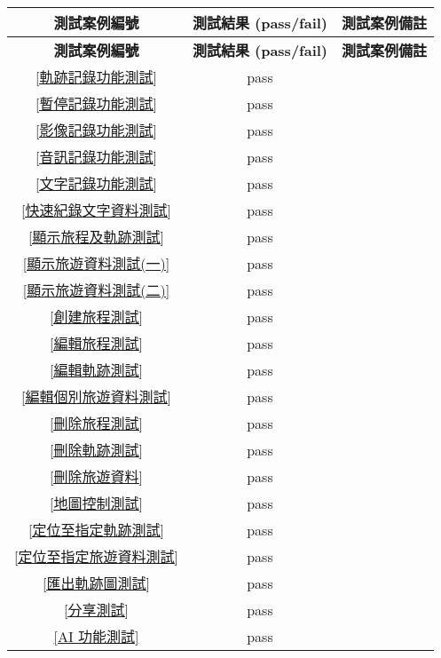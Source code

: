 \begin{longtable}{|c|c|p{8.9cm}|}
  \hline
  \textbf{測試案例編號} & \textbf{測試結果 (pass/fail)} & \textbf{測試案例備註} \\
  \hline
  \endfirsthead
  \hline
  \textbf{測試案例編號} & \textbf{測試結果 (pass/fail)} & \textbf{測試案例備註} \\
  \hline
  \endhead
  \ref{軌跡記錄功能測試} & pass & \\ 
  \hline
  \ref{暫停記錄功能測試} & pass & \\ 
  \hline
  \ref{影像記錄功能測試} & pass & \\ 
  \hline
  \ref{音訊記錄功能測試} & pass & \\ 
  \hline
  \ref{文字記錄功能測試} & pass & \\ 
  \hline
  \ref{快速紀錄文字資料測試} & pass & \\ 
  \hline
  \ref{顯示旅程及軌跡測試} & pass & \\ 
  \hline
  \ref{顯示旅遊資料測試(一)} & pass & \\ 
  \hline
  \ref{顯示旅遊資料測試(二)} & pass & \\ 
  \hline
  \ref{創建旅程測試} & pass & \\ 
  \hline
  \ref{編輯旅程測試} & pass & \\ 
  \hline
  \ref{編輯軌跡測試} & pass & \\ 
  \hline
  \ref{編輯個別旅遊資料測試} & pass & \\ 
  \hline
  \ref{刪除旅程測試} & pass & \\ 
  \hline
  \ref{刪除軌跡測試} & pass & \\ 
  \hline
  \ref{刪除旅遊資料} & pass & \\ 
  \hline
  \ref{地圖控制測試} & pass & \\ 
  \hline
  \ref{定位至指定軌跡測試} & pass & \\ 
  \hline
  \ref{定位至指定旅遊資料測試} & pass & \\ 
  \hline
  \ref{匯出軌跡圖測試} & pass & \\ 
  \hline
  \ref{分享測試} & pass & \\ 
  \hline
  \ref{AI 功能測試} & pass & \\ 
  \hline
\end{longtable}

